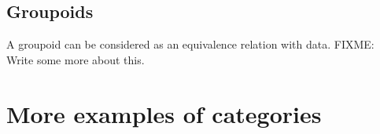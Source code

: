 \documentclass{book}
\theoremstyle{definition}
\begin{document}


\subsection{Groupoids}

A groupoid can be considered as an equivalence relation with data.
FIXME: Write some more about this.

\section{More examples of categories}
\end{document}
